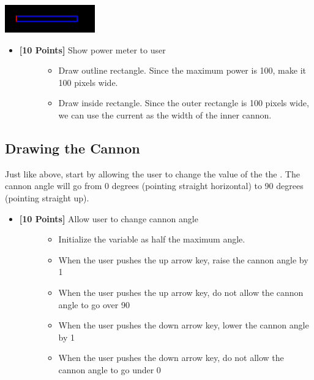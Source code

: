\documentclass[letterpaper,10pt,english]{sphinxmanual}
\begin{document}
{\hfill\includegraphics{no-power.png}\hfill}
\begin{itemize}
\item {} \begin{description}
\item[{\textbf{{[}10 Points{]}} Show power meter to user}] \leavevmode\begin{itemize}
\item {} 
Draw outline rectangle. Since the maximum power is 100, make it 100 pixels wide.

\item {} 
Draw inside rectangle. Since the outer rectangle is 100 pixels wide, we can use the current  as the width of the inner cannon.

\end{itemize}

\end{description}

\end{itemize}


\subsection{Drawing the Cannon}
\label{week_3/index:drawing-the-cannon}
Just like above, start by allowing the user to change the value of the the . The cannon angle will go from 0 degrees (pointing straight horizontal) to 90 degrees (pointing straight up).
\begin{itemize}
\item {} \begin{description}
\item[{\textbf{{[}10 Points{]}} Allow user to change cannon angle}] \leavevmode\begin{itemize}
\item {} 
Initialize the  variable as half the maximum angle.

\item {} 
When the user pushes the up arrow key, raise the cannon angle by 1

\item {} 
When the user pushes the up arrow key, do not allow the cannon angle to go over 90

\item {} 
When the user pushes the down arrow key, lower the cannon angle by 1

\item {} 
When the user pushes the down arrow key, do not allow the cannon angle to go under 0

\end{itemize}

\end{description}

\end{itemize}
\end{document}
